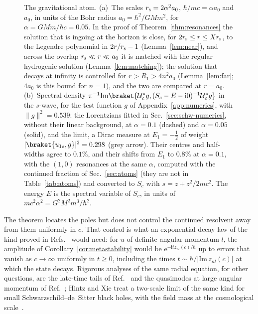\documentclass[%
 aip,
 jmp,
 amsmath,amssymb,
 reprint, onecolumn
]{revtex4-1}
\theoremstyle{definition}
\theoremstyle{remark}
\newcommand{\rmi}{\mathrm{i}}
\newcommand{\rme}{\mathrm{e}}
\begin{document}
\begin{figure}[htb]
\caption{The gravitational atom. (a)~The scales $r_{\rm s}=2\alpha^2a_0$,
$\hbar/mc=\alpha a_0$ and $a_0$, in units of the Bohr radius
$a_0=\hbar^2/GMm^2$, for $\alpha=GMm/\hbar c=0.05$. In the proof of
Theorem~\ref{thm:resonances} the solution that is ingoing at the
horizon is close, for $2r_{\rm s}\leq r\leq Xr_{\rm s}$, to the Legendre
polynomial in $2r/r_{\rm s}-1$ (Lemma~\ref{lem:near}), and across the
overlap $r_{\rm s}\ll r\ll a_0$ it is matched with the regular
hydrogenic solution (Lemma~\ref{lem:matching}); the solution that
decays at infinity is controlled for $r>R_1>4n^2a_0$
(Lemma~\ref{lem:far}; $4a_0$ is this bound for $n=1$), and the two are
compared at $r=a_0$. (b)~Spectral density
$\pi^{-1}\mathrm{Im}\braket{\mathcal{U}_c^*g,(S_c-E-\rmi0)^{-1}
\mathcal{U}_c^*g}$ in the $s$-wave, for the test function $g$ of
Appendix~\ref{app:numerics}, with $\|g\|^2=0.539$: the Lorentzians
fitted in Sec.~\ref{sec:schw-numerics}, without their linear
background, at $\alpha=0.1$ (dashed) and $\alpha=0.05$ (solid), and the
limit, a Dirac measure at $E_1=-\frac12$ of weight
$|\braket{u_{1s},g}|^2=0.298$ (grey arrow). Their centres and
half-widths agree to $0.1\%$, and their shifts from $E_1$ to $0.8\%$ at
$\alpha=0.1$, with the $(1,0)$ resonances at the same $\alpha$,
computed with the continued fraction of Sec.~\ref{sec:atoms} (they are
not in Table~\ref{tab:atoms}) and converted to $S_c$ with
$s=z+z^2/2mc^2$. The energy $E$ is the spectral variable of $S_c$, in
units of $mc^2\alpha^2=G^2M^2m^3/\hbar^2$.}
\label{fig:atom}
\end{figure}


The theorem locates the poles but does not control the continued
resolvent away from them uniformly in $c$. That control is what an
exponential decay law of the kind proved in
Refs.~ would need: for $u$ of definite angular
momentum $l$, the amplitude of Corollary~\ref{cor:metastability} would be
$\rme^{-\rmi tz_{nl}(c)/\hbar}$ up to errors that vanish as $c\to\infty$
uniformly in $t\geq0$, including the times $t\sim\hbar/|\mathrm{Im}\,
z_{nl}(c)|$ at which the state decays. Rigorous analyses of the same
radial equation, for other questions, are the late-time tails of
Ref.~ and the
quasimodes at large angular momentum of
Ref.~; Hintz and Xie treat
a two-scale limit of the same kind for small Schwarzschild--de~Sitter
black holes, with the field mass at the cosmological
scale~\cite{HintzXie2022}.
\end{document}
